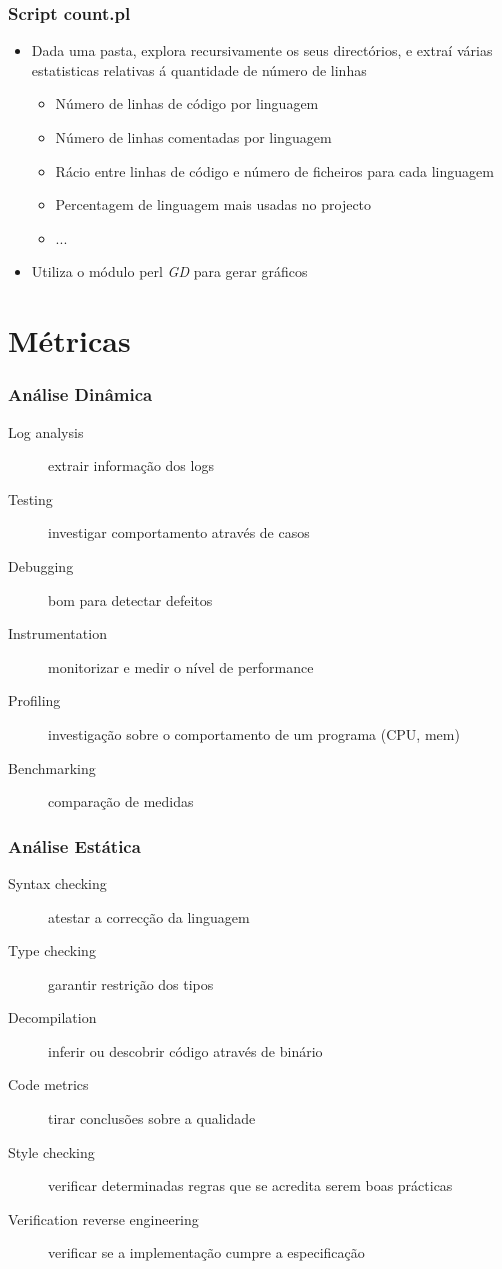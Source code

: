 \documentclass{beamer}
\begin{document}
\begin{frame} \frametitle{Script count.pl}
\begin{itemize} 
\item Dada uma pasta, explora recursivamente os seus directórios, e extraí várias estatisticas relativas á quantidade de número de linhas
  \begin{itemize}
    \item Número de linhas de código por linguagem
    \item Número de linhas comentadas por linguagem
	\item Rácio entre linhas de código e número de ficheiros para cada linguagem
	\item Percentagem de linguagem mais usadas no projecto
	\item ...
  \end{itemize}
\item Utiliza o módulo perl \textit{GD} para gerar gráficos
\end{itemize}
\end{frame}

\section{Métricas}
\begin{frame} \frametitle{Análise Dinâmica}
\begin{description}
\item[Log analysis] extrair informação dos logs
\item[Testing] investigar comportamento através de casos
\item[Debugging] bom para detectar defeitos
\item[Instrumentation] monitorizar e medir o nível de performance
\item[Profiling] investigação sobre o comportamento de um programa (CPU, mem)
\item[Benchmarking] comparação de medidas
\end{description}
\end{frame}

\begin{frame} \frametitle{Análise Estática}
\begin{description}
\item[Syntax checking] atestar a correcção da linguagem
\item[Type checking] garantir restrição dos tipos
\item[Decompilation] inferir ou descobrir código através de binário
\item[Code metrics] tirar conclusões sobre a qualidade
\item[Style checking] verificar determinadas regras que se acredita serem boas prácticas
\item[Verification reverse engineering] verificar se a implementação cumpre a especificação
\end{description}
\end{frame}
\end{document}
